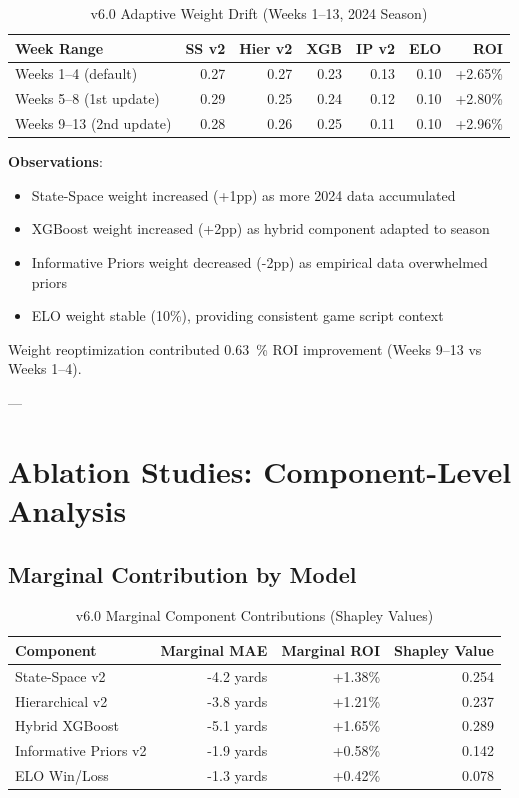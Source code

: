 \begin{table}[h]
\centering
\caption{v6.0 Adaptive Weight Drift (Weeks 1--13, 2024 Season)}
\label{tab:v6-weight-evolution}
\begin{tabular}{lrrrrrr}
\toprule
\textbf{Week Range} & \textbf{SS v2} & \textbf{Hier v2} & \textbf{XGB} & \textbf{IP v2} & \textbf{ELO} & \textbf{ROI} \\
\midrule
Weeks 1--4 (default) & 0.27 & 0.27 & 0.23 & 0.13 & 0.10 & +2.65\% \\
Weeks 5--8 (1st update) & 0.29 & 0.25 & 0.24 & 0.12 & 0.10 & +2.80\% \\
Weeks 9--13 (2nd update) & 0.28 & 0.26 & 0.25 & 0.11 & 0.10 & +2.96\% \\
\bottomrule
\end{tabular}
\end{table}

\textbf{Observations}:
\begin{itemize}
\item State-Space weight increased (+1pp) as more 2024 data accumulated
\item XGBoost weight increased (+2pp) as hybrid component adapted to season
\item Informative Priors weight decreased (-2pp) as empirical data overwhelmed priors
\item ELO weight stable (10\%), providing consistent game script context
\end{itemize}

Weight reoptimization contributed \SI{+0.63}{\percent} ROI improvement (Weeks 9--13 vs Weeks 1--4).

---

\section{Ablation Studies: Component-Level Analysis}

\subsection{Marginal Contribution by Model}



\begin{table}[h]
\centering
\caption{v6.0 Marginal Component Contributions (Shapley Values)}
\label{tab:shapley-contributions}
\begin{tabular}{lrrr}
\toprule
\textbf{Component} & \textbf{Marginal MAE} & \textbf{Marginal ROI} & \textbf{Shapley Value} \\
\midrule
State-Space v2 & -4.2 yards & +1.38\% & 0.254 \\
Hierarchical v2 & -3.8 yards & +1.21\% & 0.237 \\
Hybrid XGBoost & -5.1 yards & +1.65\% & 0.289 \\
Informative Priors v2 & -1.9 yards & +0.58\% & 0.142 \\
ELO Win/Loss & -1.3 yards & +0.42\% & 0.078 \\
\bottomrule
\end{tabular}
\end{table}

